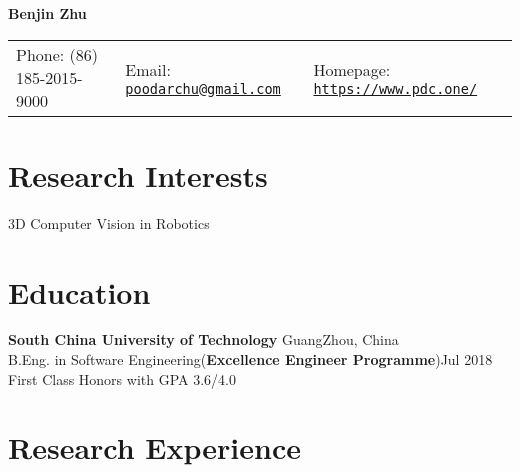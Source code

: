 \documentclass[letterpaper]{article}
\def\name{Benjin Zhu}
\renewenvironment{itemize}{
  \begin{list}{}{
    \setlength{\leftmargin}{1.5em}
  }
}{
  \end{list}
}
\begin{document}
\centerline{\huge \bf \name}


\begin{center}
\begin{tabular}{lll}
Phone: (86) 185-2015-9000 & Email: \href{mailto:poodarchu@gmail.com}{\tt poodarchu@gmail.com} & Homepage: \href{https://pdc.one/}{\tt https://www.pdc.one/} \\
  \end{tabular}
\end{center}

\section*{Research Interests}
3D Computer Vision in Robotics


\section*{Education}
\begin{itemize}
  \item \textbf{South China University of Technology} \hfill GuangZhou, China 
        \\ B.Eng. in Software Engineering(\textbf{Excellence Engineer Programme})\hfill Jul 2018
        \\ First Class Honors with GPA 3.6/4.0
\end{itemize}


\section*{Research Experience}
\end{document}
